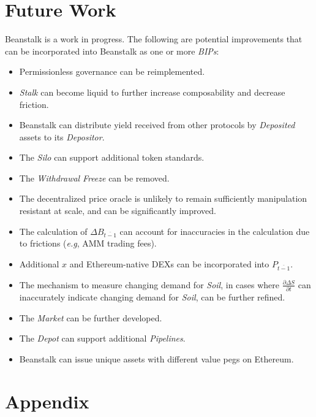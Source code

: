 \documentclass[tikz]{article}
\newcommand{\term}[1]{\textsl{#1}}
\begin{document}
\section{Future Work}
Beanstalk is a work in progress. The following are potential improvements that can be incorporated into Beanstalk as one or more \term{BIPs}:

\newpage
\begin{itemize}
    \item Permissionless governance can be reimplemented.
    \item \term{Stalk} can become liquid to further increase composability and decrease friction. 
    \item Beanstalk can distribute yield received from other protocols by \term{Deposited} assets to its \term{Depositor}.
    \item The \term{Silo} can support additional token standards.
    \item The \term{Withdrawal} \term{Freeze} can be removed.
    \item The decentralized price oracle is unlikely to remain sufficiently manipulation resistant at scale, and can be significantly improved. 
    \item The calculation of $\Delta B_{\overline{t-1}}$ can account for inaccuracies in the calculation due to frictions (\term{e.g}, AMM trading fees).
    \item Additional $x$ and Ethereum-native DEXs can be incorporated into $P_{\overline{t-1}}$.
    \item The mechanism to measure changing demand for \term{Soil}, in cases where $\frac{\partial \Delta S}{\partial t}$ can inaccurately indicate changing demand for \term{Soil}, can be further refined.
    \item The \term{Market} can be further developed.
    \item The \term{Depot} can support additional \term{Pipelines}.
    \item Beanstalk can issue unique assets with different value pegs on Ethereum.
\end{itemize}

\newpage
\section{Appendix}

\newpage
\end{document}
